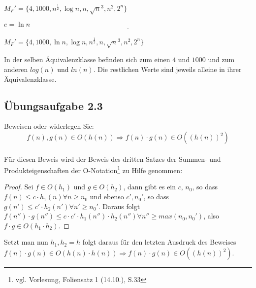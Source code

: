 \documentclass{article}
\begin{document}
\begin{flushright}
	$M_F' = \{4,1000,n^{\frac{1}{2}},\operatorname{log}n,n,\sqrt{n}^3,n^2,2^n\}$
\end{flushright}
\vspace{0.6cm}
$e = \operatorname{ln}n$
\begin{equation*}
	\begin{array}{llll}
		.
	\end{array}
\end{equation*}
\begin{flushright}
	$M_F' = \{4,1000,\operatorname{ln} n, \operatorname{log} n, n^{\frac{1}{2}}, n, \sqrt{n}^3, n^2, 2^n\}$
\end{flushright}
In der selben Äquivalenzklasse befinden sich zum einen $4$ und $1000$ und zum anderen $log(n)$ und $ln(n)$. Die restlichen Werte sind jeweils alleine in ihrer Äquivalenzklasse.
\\
\subsection{Übungsaufgabe 2.3}
\begin{flushright}
\begin{Large}
[~~~~\string| ~~2~]
\end{Large}
\end{flushright}
Beweisen oder widerlegen Sie:
\[
	f(n),g(n) \in O(h(n)) \Rightarrow f(n)\cdot g(n) \in O((h(n))^2)
\]
\vspace{1cm}\\
Für diesen Beweis wird der Beweis des dritten Satzes der Summen- und Produkteigenschaften der O-Notation\footnote{vgl. Vorlesung, Foliensatz 1 (14.10.), S.33} zu Hilfe genommen:
\begin{proof}
Sei $f\in O(h_1)$ und $g\in O(h_2)$, dann gibt es ein $c$, $n_0$, so dass $f(n) \leq c \cdot h_1(n) \forall n \geq n_0$ und ebenso $c', n_0'$, so dass $g(n') \leq c' \cdot h_2(n') \forall n' \geq n_0'$.
Daraus folgt $f(n'')\cdot g(n'') \leq c \cdot c' \cdot h_1(n'') \cdot h_2(n'') \forall n'' \geq max(n_0, n_0')$, also $f \cdot g \in O(h_1 \cdot h_2)$.
\end{proof}
Setzt man nun $h_1, h_2 = h$ folgt daraus für den letzten Ausdruck des Beweises $f(n) \cdot g(n) \in O(h(n) \cdot h(n)) \Rightarrow f(n) \cdot g(n) \in O((h(n))^2)$.
\end{document}
